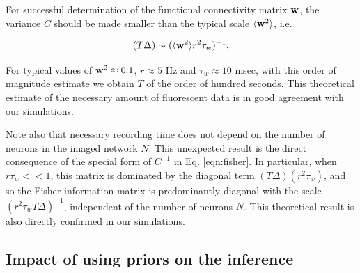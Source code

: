 For successful determination of the functional connectivity matrix $\mathbf{w}$, the variance $C$ should be made smaller than the typical scale $\langle \mathbf{w}^2\rangle$, i.e.

\begin{equation}
(T\Delta) \sim (\langle \bw^2 \rangle r^2  \tau_w)^{-1}.
\end{equation}

For typical values of $\mathbf{w}^2\approx 0.1$, $r\approx 5$  Hz and $ \tau_w \approx 10$ msec,
with this order of magnitude estimate we obtain $T$ of the order of hundred seconds. This theoretical estimate of the necessary amount of fluorescent data is in good agreement with our simulations.

Note also that necessary recording time does not depend on the number of neurons in the imaged network $N$. This unexpected result is the direct consequence of the special form of $C^{-1}$ in Eq. \ref{eqn:fisher}. In particular, when $r \tau_w <<1$, this matrix is dominated by the diagonal term $(T\Delta)(r^2  \tau_w)$, and so the Fisher information matrix is predominantly diagonal with the scale $(r^2 \tau_w T\Delta)^{-1}$, independent of the number of neurons $N$. This theoretical result is also directly confirmed in our simulations.

\subsection{Impact of using priors on the inference}

